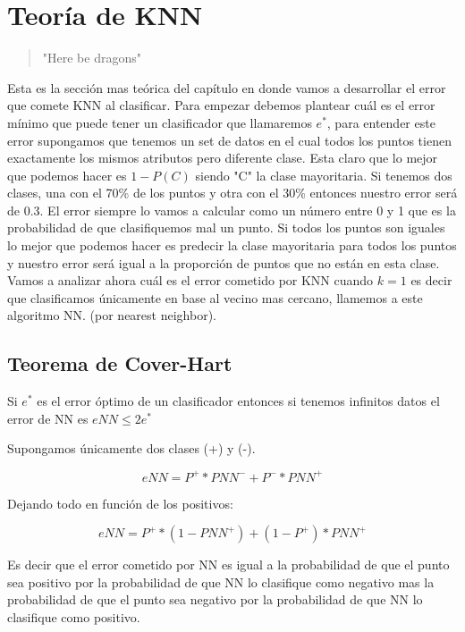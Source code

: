 \section{Teoría de KNN}

\begin{framed}
\begin{quote}
"Here be dragons"
\end{quote}
\end{framed}

Esta es la sección mas teórica del capítulo en donde vamos a desarrollar el error que comete KNN al clasificar. Para empezar debemos plantear cuál es el error mínimo que puede tener un clasificador que llamaremos $e^*$, para entender este error supongamos que tenemos un set de datos en el cual todos los puntos tienen exactamente los mismos atributos pero diferente clase. Esta claro que lo mejor que podemos hacer es $1-P(C)$ siendo "C" la clase mayoritaria. Si tenemos dos clases, una con el 70\% de los puntos y otra con el 30\% entonces nuestro error será de 0.3. El error siempre lo vamos a calcular como un número entre 0 y 1 que es la probabilidad de que clasifiquemos mal un punto. Si todos los puntos son iguales lo mejor que podemos hacer es predecir la clase mayoritaria para todos los puntos y nuestro error será igual a la proporción de puntos que no están en esta clase.
Vamos a analizar ahora cuál es el error cometido por KNN cuando $k=1$ es decir que clasificamos únicamente en base al vecino mas cercano, llamemos a este algoritmo NN. (por nearest neighbor). 

\subsection{Teorema de Cover-Hart}

\begin{theorem}
Si $e^*$ es el error óptimo de un clasificador entonces si tenemos infinitos datos el error de NN es $eNN \leq 2 e^*$
\end{theorem}

Supongamos únicamente dos clases (+)  y (-).

$$ eNN = P^+ * PNN^- + P^- * PNN^+$$

Dejando todo en función de los positivos:

$$ eNN = P^+  *  (1-PNN^+) + (1-P^+) * PNN^+$$

Es decir que el error cometido por NN es igual a la probabilidad de que el punto sea positivo por la probabilidad de que NN lo clasifique como negativo mas la probabilidad de que el punto sea negativo por la probabilidad de que NN lo clasifique como positivo.

